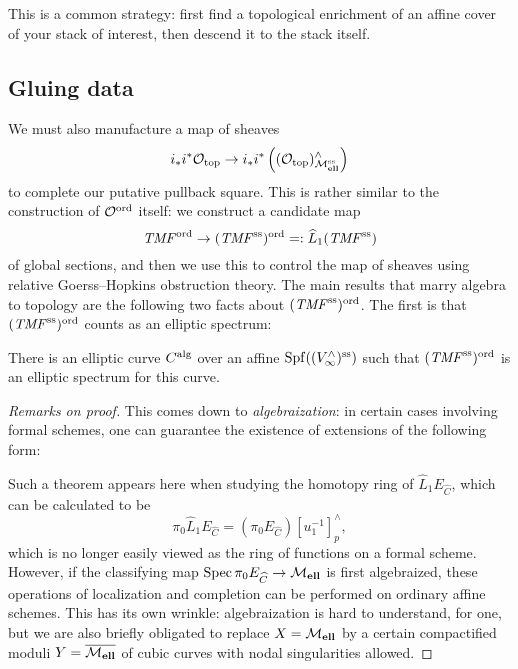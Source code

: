 \begin{remark}
This is a common strategy: first find a topological enrichment of an affine cover of your stack of interest, then descend it to the stack itself.
\end{remark}





\subsection*{Gluing data}

We must also manufacture a map of sheaves \[i_* i^* \mathcal{O}_{\mathrm{top}} \to i_* i^* \left((\mathcal{O}_{\mathrm{top}})^\wedge_{\mathcal{M}_{\mathbf{ell}}^{\mathrm{ss}}}\right)\] to complete our putative pullback square.  This is rather similar to the construction of \(\mathcal{O}^{\mathrm{ord}}\) itself: we construct a candidate map \[\mathit{TMF}^{\mathrm{ord}} \to (\mathit{TMF}^{\mathrm{ss}})^{\mathrm{ord}} =: \widehat L_1 (\mathit{TMF}^{\mathrm{ss}})\] of global sections, and then we use this to control the map of sheaves using relative Goerss--Hopkins obstruction theory.  The main results that marry algebra to topology are the following two facts about \((\mathit{TMF}^{\mathrm{ss}})^{\mathrm{ord}}\).  The first is that \((\mathit{TMF}^{\mathrm{ss}})^{\mathrm{ord}}\) counts as an elliptic spectrum:

\begin{lemma}
There is an elliptic curve \(C^{\mathrm{alg}}\) over an affine \(\operatorname{Spf} ((V^\wedge_\infty)^{\mathrm{ss}})\) such that \((\mathit{TMF}^{\mathrm{ss}})^{\mathrm{ord}}\) is an elliptic spectrum for this curve.
\end{lemma}
\begin{proof}[Remarks on proof]
This comes down to \textit{algebraization}: in certain cases involving formal schemes, one can guarantee the existence of extensions of the following form:
\begin{center}
\end{center}
Such a theorem appears here when studying the homotopy ring of \(\widehat L_1 E_{\widehat C}\), which can be calculated to be \[\pi_0 \widehat L_1 E_{\widehat C} = (\pi_0 E_{\widehat C})[u_1^{-1}]^\wedge_p,\] which is no longer easily viewed as the ring of functions on a formal scheme.  However, if the classifying map \(\operatorname{Spec} \pi_0 E_{\widehat C} \to \mathcal{M}_{\mathbf{ell}}\) is first algebraized, these operations of localization and completion can be performed on ordinary affine schemes.  This has its own wrinkle: algebraization is hard to understand, for one, but we are also briefly obligated to replace \(X = \mathcal{M}_{\mathbf{ell}}\) by a certain compactified moduli \(Y = \overline{\mathcal{M}_{\mathbf{ell}}}\) of cubic curves with nodal singularities allowed.
\end{proof}

